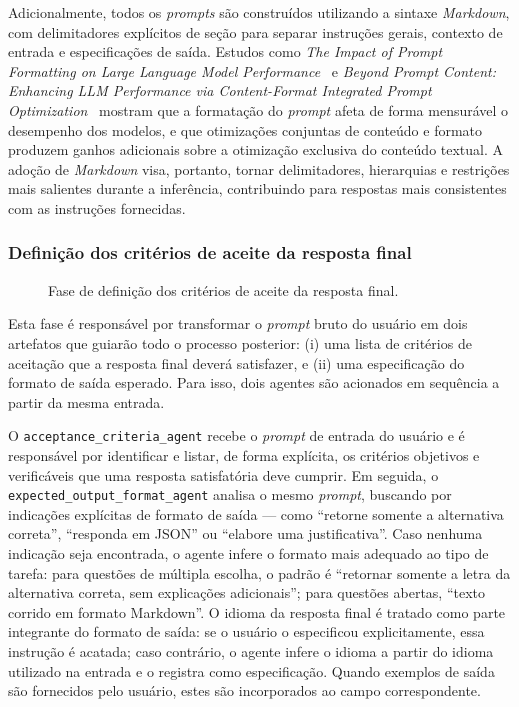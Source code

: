 \documentclass[a4paper,10pt,twocolumn]{article}
\begin{document}
Adicionalmente, todos os \textit{prompts} são construídos utilizando a sintaxe \textit{Markdown}, com delimitadores explícitos de seção para separar instruções gerais, contexto de entrada e especificações de saída. Estudos como \textit{The Impact of Prompt Formatting on Large Language Model Performance}~\cite{he2024promptformatting} e \textit{Beyond Prompt Content: Enhancing LLM Performance via Content-Format Integrated Prompt Optimization}~\cite{liu2025contentformat} mostram que a formatação do \textit{prompt} afeta de forma mensurável o desempenho dos modelos, e que otimizações conjuntas de conteúdo e formato produzem ganhos adicionais sobre a otimização exclusiva do conteúdo textual. A adoção de \textit{Markdown} visa, portanto, tornar delimitadores, hierarquias e restrições mais salientes durante a inferência, contribuindo para respostas mais consistentes com as instruções fornecidas.

\subsubsection{Definição dos critérios de aceite da resposta final}

\begin{figure}[H]
  \centering
  
  \caption{Fase de definição dos critérios de aceite da resposta final.}
  \label{fig:definicao_criterios}
\end{figure}

Esta fase é responsável por transformar o \textit{prompt} bruto do usuário em dois artefatos que guiarão todo o processo posterior: (i) uma lista de critérios de aceitação que a resposta final deverá satisfazer, e (ii) uma especificação do formato de saída esperado. Para isso, dois agentes são acionados em sequência a partir da mesma entrada.

O \texttt{acceptance\_criteria\_agent} recebe o \textit{prompt} de entrada do usuário e é responsável por identificar e listar, de forma explícita, os critérios objetivos e verificáveis que uma resposta satisfatória deve cumprir. Em seguida, o \texttt{expected\_output\_format\_agent} analisa o mesmo \textit{prompt}, buscando por indicações explícitas de formato de saída — como ``retorne somente a alternativa correta'', ``responda em JSON'' ou ``elabore uma justificativa''. Caso nenhuma indicação seja encontrada, o agente infere o formato mais adequado ao tipo de tarefa: para questões de múltipla escolha, o padrão é ``retornar somente a letra da alternativa correta, sem explicações adicionais''; para questões abertas, ``texto corrido em formato Markdown''. O idioma da resposta final é tratado como parte integrante do formato de saída: se o usuário o especificou explicitamente, essa instrução é acatada; caso contrário, o agente infere o idioma a partir do idioma utilizado na entrada e o registra como especificação. Quando exemplos de saída são fornecidos pelo usuário, estes são incorporados ao campo correspondente.
\end{document}
